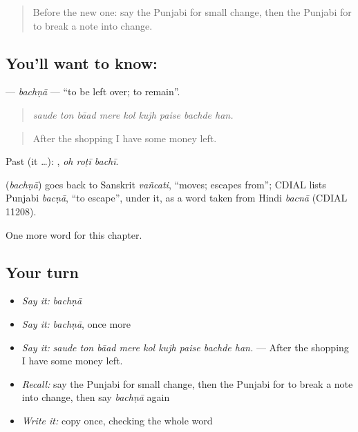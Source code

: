 \begin{quote}
Before the new one: say the Punjabi for small change, then the Punjabi for to break a note into change.
\end{quote}

\subsection*{You'll want to know: }
\textbf{} — \emph{bachṇā} — \textquotedblleft{}to be left over; to remain\textquotedblright{}.

\begin{quote}
        
\end{quote}

\begin{quote}
\emph{saude ton bāad mere kol kujh paise bachde han.}
\end{quote}

\begin{quote}
After the shopping I have some money left.
\end{quote}

Past (it …):   , \emph{oh roṭī bachī}.

\begin{cousinweb}
\textbf{} (\emph{bachṇā}) goes back to Sanskrit \emph{vañcati}, \textquotedblleft{}moves; escapes from\textquotedblright{}; CDIAL lists Punjabi \emph{bacṇā}, \textquotedblleft{}to escape\textquotedblright{}, under it, as a word taken from Hindi \emph{bacnā} (CDIAL 11208).
\end{cousinweb}

\begin{grammarlens}[title={What you've built}]
One more word for this chapter.
\end{grammarlens}

\subsection*{Your turn}
\begin{itemize}
\raggedright
  \item \emph{Say it:} \emph{bachṇā}
  \item \emph{Say it:} \emph{bachṇā}, once more
  \item \emph{Say it:} \emph{saude ton bāad mere kol kujh paise bachde han.} — After the shopping I have some money left.
  \item \emph{Recall:} say the Punjabi for small change, then the Punjabi for to break a note into change, then say \emph{bachṇā} again
  \item \emph{Write it:} copy \textbf{} once, checking the whole word
\end{itemize}

